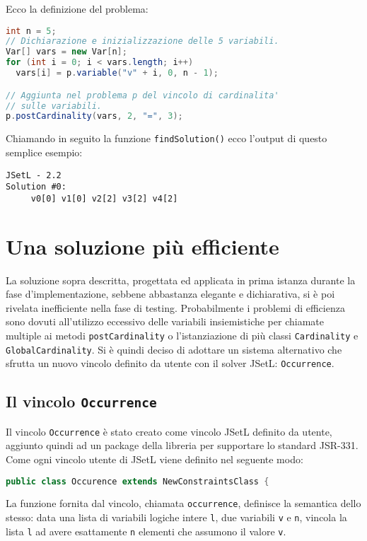 Ecco la definizione del problema:
\begin{lstlisting}[language=Java,
                   caption = {esempio di utilizzo di postCardinality},
                   frame = single]
int n = 5;
// Dichiarazione e inizializzazione delle 5 variabili.
Var[] vars = new Var[n];
for (int i = 0; i < vars.length; i++)
  vars[i] = p.variable("v" + i, 0, n - 1);

// Aggiunta nel problema p del vincolo di cardinalita' 
// sulle variabili.
p.postCardinality(vars, 2, "=", 3);
\end{lstlisting}

Chiamando in seguito la funzione \texttt{findSolution()}  ecco l'output di 
questo semplice esempio:
\begin{verbatim}
JSetL - 2.2
Solution #0:
	 v0[0] v1[0] v2[2] v3[2] v4[2]
\end{verbatim}

\section{Una soluzione più efficiente}
La soluzione sopra descritta, progettata ed applicata in prima istanza durante 
la fase d'implementazione, sebbene abbastanza elegante e dichiarativa, si è
poi rivelata inefficiente nella fase di testing. 
Probabilmente i problemi di
efficienza sono dovuti all'utilizzo eccessivo delle variabili insiemistiche
per chiamate multiple ai metodi \texttt{postCardinality} o l'istanziazione
di più classi \texttt{Cardinality} e \texttt{GlobalCardinality}.
Si è quindi deciso di adottare un sistema alternativo che sfrutta un nuovo
vincolo definito da utente con il solver JSetL: \texttt{Occurrence}.

\subsection{Il vincolo \texttt{Occurrence}}\label{occurrence}
Il vincolo \texttt{Occurrence} è stato creato come vincolo JSetL definito da 
utente, aggiunto quindi ad un package della libreria per supportare lo standard
JSR-331. Come ogni vincolo utente di JSetL viene definito nel seguente modo:
\begin{lstlisting}[language = Java, frame = single]
public class Occurence extends NewConstraintsClass {
\end{lstlisting}

La funzione fornita dal vincolo, chiamata \texttt{occurrence}, definisce la
semantica dello stesso: data una lista di variabili logiche intere \texttt{l}, 
due variabili \texttt{v} e \texttt{n}, vincola la lista \texttt{l} ad avere
esattamente  \texttt{n} elementi che assumono il valore \texttt{v}.


